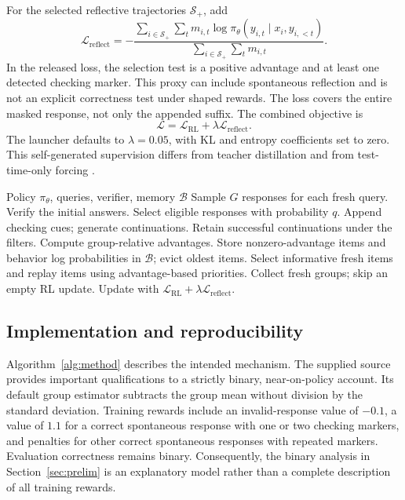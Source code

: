 \documentclass[10pt,twocolumn]{article}
\begin{document}
For the selected reflective trajectories $\mathcal S_+$, add
\begin{equation}
 \mathcal L_{\mathrm{reflect}}=
 -\frac{\sum_{i\in\mathcal S_+}\sum_t m_{i,t}
 \log\pi_\theta(y_{i,t}\mid x_i,y_{i,<t})}
 {\sum_{i\in\mathcal S_+}\sum_t m_{i,t}}.
 \label{eq:sft}
\end{equation}
In the released loss, the selection test is a positive advantage and at least one detected checking marker. This proxy can include spontaneous reflection and is not an explicit correctness test under shaped rewards. The loss covers the entire masked response, not only the appended suffix. The combined objective is
\begin{equation}
 \mathcal L=\mathcal L_{\mathrm{RL}}+
 \lambda\mathcal L_{\mathrm{reflect}}.
 \label{eq:combined}
\end{equation}
The launcher defaults to $\lambda=0.05$, with KL and entropy coefficients set to zero. This self-generated supervision differs from teacher distillation and from test-time-only forcing \citep{s1,vision-r1}.

\begin{algorithm}[t]
\caption{Intended SSR and rethinking update}
\label{alg:method}
\begin{algorithmic}[1]
\Require Policy $\pi_\theta$, queries, verifier, memory $\mathcal B$
\State Sample $G$ responses for each fresh query.
\State Verify the initial answers.
\State Select eligible responses with probability $q$.
\State Append checking cues; generate continuations.
\State Retain successful continuations under the filters.
\EndIf
\State Compute group-relative advantages.
\State Store nonzero-advantage items and behavior log probabilities in $\mathcal B$; evict oldest items.
\State Select informative fresh items and replay items using advantage-based priorities.
\State Collect fresh groups; skip an empty RL update.
\Else
\State Update with $\mathcal L_{\mathrm{RL}}+\lambda\mathcal L_{\mathrm{reflect}}$.
\EndIf
\end{algorithmic}
\end{algorithm}

\subsection{Implementation and reproducibility}
\label{sec:implementation}
Algorithm~\ref{alg:method} describes the intended mechanism. The supplied source provides important qualifications to a strictly binary, near-on-policy account. Its default group estimator subtracts the group mean without division by the standard deviation. Training rewards include an invalid-response value of $-0.1$, a value of $1.1$ for a correct spontaneous response with one or two checking markers, and penalties for other correct spontaneous responses with repeated markers. Evaluation correctness remains binary. Consequently, the binary analysis in Section~\ref{sec:prelim} is an explanatory model rather than a complete description of all training rewards.
\end{document}

